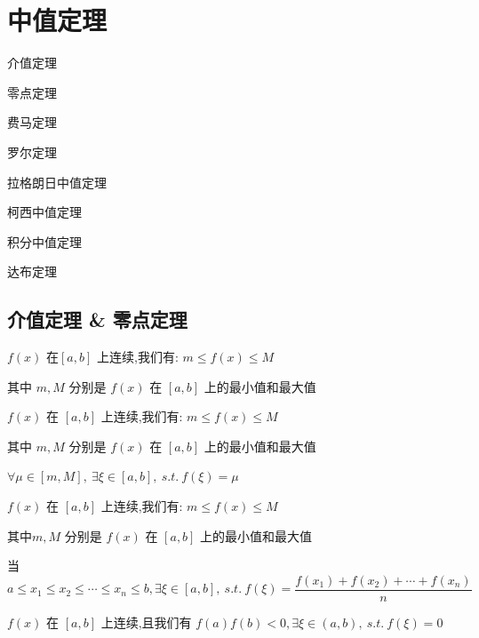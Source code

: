 \chapter{中值定理}
\begin{introduction}
	\item 介值定理
	\item 零点定理
	\item 费马定理
	\item 罗尔定理
	\item 拉格朗日中值定理
	\item 柯西中值定理
	\item 积分中值定理
	\item 达布定理
\end{introduction}
\section{介值定理 \& 零点定理}

\begin{theorem}[有界和最值定理]

	$f(x)$ 在$[a,b]$ 上连续,我们有: $m\leq f(x)\leq M$

	其中 $m,M$ 分别是 $f(x)$ 在 $[a,b]$ 上的最小值和最大值
\end{theorem}
\begin{theorem}[介值定理]

	$f(x)$ 在 $[a,b]$ 上连续,我们有: $m\leq f(x)\leq M$

	其中 $m,M$ 分别是 $f(x)$ 在 $[a,b]$ 上的最小值和最大值

	$\forall \mu\in [m,M],\ \exists \xi\in[a,b],\ s.t.\ f(\xi)=\mu$
\end{theorem}
\begin{theorem}[平均值定理]

	$f(x)$ 在 $[a,b]$ 上连续,我们有: $m\leq f(x)\leq M$

	其中$m,M$ 分别是 $f(x)$ 在 $[a,b]$ 上的最小值和最大值

	当 $a\leq x_{1}\leq x_{2}\leq\cdots\leq x_{n}\leq b,\exists \xi\in[a,b],\ s.t.\ f(\xi)=\dfrac{f(x_{1})+f(x_{2})+\cdots+f(x_{n})}{n}$
\end{theorem}
\begin{theorem}[零点定理]

	$f(x)$ 在 $[a,b]$ 上连续,且我们有 $f(a)f(b)<0,\exists \xi\in(a,b),\ s.t.\ f(\xi)=0$
\end{theorem}


